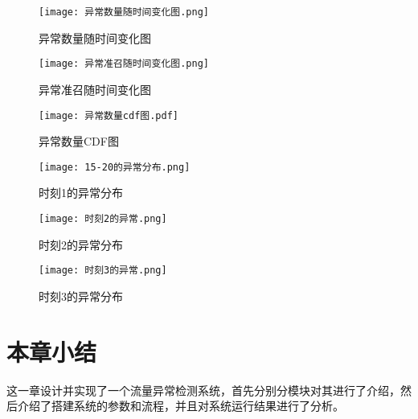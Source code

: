\begin{figure}
  \centering
  \texttt{[image: 异常数量随时间变化图.png]}
  \caption{异常数量随时间变化图}
  \label{fig:异常数量}
\end{figure}

\begin{figure}
  \centering
  \texttt{[image: 异常准召随时间变化图.png]}
  \caption{异常准召随时间变化图}
  \label{fig:异常准召}
\end{figure}

\begin{figure}[htbp]
  \centering
  \begin{minipage}[t]{0.48\textwidth}
  \centering
  \texttt{[image: 异常数量cdf图.pdf]}
  \caption{异常数量CDF图}
  \end{minipage}
  \begin{minipage}[t]{0.48\textwidth}
  \centering
  \texttt{[image: 15-20的异常分布.png]}
  \caption{时刻1的异常分布}
  \end{minipage}
  \end{figure}

  \begin{figure}[htbp]
    \centering
    \begin{minipage}[t]{0.48\textwidth}
    \centering
    \texttt{[image: 时刻2的异常.png]}
    \caption{时刻2的异常分布}
    \end{minipage}
    \begin{minipage}[t]{0.48\textwidth}
    \centering
    \texttt{[image: 时刻3的异常.png]}
    \caption{时刻3的异常分布}
    \end{minipage}
    \end{figure}



\section{本章小结}
这一章设计并实现了一个流量异常检测系统，首先分别分模块对其进行了介绍，然后介绍了搭建系统的参数和流程，并且对系统运行结果进行了分析。


